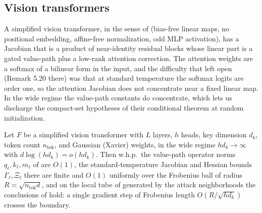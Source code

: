 \subsection{Vision transformers}
A simplified vision transformer, in the sense of \cite[\S5.3]{advExt} (bias-free linear maps, no
positional embedding, affine-free normalization, odd MLP activation), has a Jacobian that is a product
of near-identity residual blocks whose linear part is a gated value-path plus a low-rank attention
correction. The attention weights are a softmax of a bilinear form in the input, and the difficulty
that \cite{advExt} left open (Remark 5.20 there) was that at standard temperature the softmax logits are
order one, so the attention Jacobian does not concentrate near a fixed linear map. In the wide regime
the value-path constants do concentrate, which lets us discharge the compact-set hypotheses of their
conditional theorem at random initialization.

\begin{theorem}\label{thm:vit}
Let $F$ be a simplified vision transformer with $L$ layers, $h$ heads, key dimension $d_k$, token count
$n_{\mathrm{tok}}$, and Gaussian (Xavier) weights, in the wide regime $hd_k\to\infty$ with
$d\log(hd_k)=o(hd_k)$. Then w.h.p.\ the value-path operator norms $q_\ell,k_\ell,m_\ell$ of
\cite[Thm 5.16]{advExt} are $O(1)$, the standard-temperature Jacobian and Hessian bounds
$\Gamma_\ell,\Xi_\ell$ there are finite and $O(1)$ uniformly over the Frobenius ball of radius
$R\asymp\sqrt{n_{\mathrm{tok}}d}$, and on the local tube of \cite[Rem 5.17]{advExt} generated by the
attack neighborhoods the conclusions of  hold: a single gradient step of
Frobenius length $O(R/\sqrt{hd_k})$ crosses the boundary.
\end{theorem}

